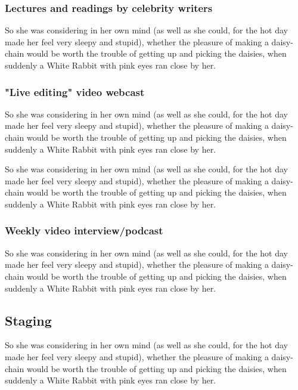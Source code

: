 \documentclass[12pt]{article}
\begin{document}
\subsubsection{Lectures and readings by celebrity writers}
\label{sec:orgheadline31}
So she was considering in her own mind (as well as she could, for the hot day made her feel very sleepy and stupid), whether the pleasure of making a daisy-chain would be worth the trouble of getting up and picking the daisies, when suddenly a White Rabbit with pink eyes ran close by her. 

\subsubsection{"Live editing" video webcast}
\label{sec:orgheadline32}
So she was considering in her own mind (as well as she could, for the hot day made her feel very sleepy and stupid), whether the pleasure of making a daisy-chain would be worth the trouble of getting up and picking the daisies, when suddenly a White Rabbit with pink eyes ran close by her. 

So she was considering in her own mind (as well as she could, for the hot day made her feel very sleepy and stupid), whether the pleasure of making a daisy-chain would be worth the trouble of getting up and picking the daisies, when suddenly a White Rabbit with pink eyes ran close by her. 

\subsubsection{Weekly video interview/podcast}
\label{sec:orgheadline33}
So she was considering in her own mind (as well as she could, for the hot day made her feel very sleepy and stupid), whether the pleasure of making a daisy-chain would be worth the trouble of getting up and picking the daisies, when suddenly a White Rabbit with pink eyes ran close by her. 

\subsection{Staging}
\label{sec:orgheadline39}
So she was considering in her own mind (as well as she could, for the hot day made her feel very sleepy and stupid), whether the pleasure of making a daisy-chain would be worth the trouble of getting up and picking the daisies, when suddenly a White Rabbit with pink eyes ran close by her. 
\end{document}
